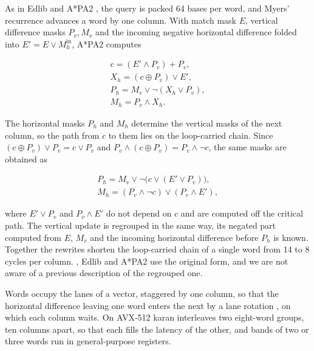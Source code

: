 As in Edlib and A*PA2 \citep{Sosic2017edlib,GrootKoerkamp2024astarpa2}, the query is packed 64 bases per word, and Myers' recurrence \citep{Myers1999bitvector} advances a word by one column. With match mask \(E\), vertical difference masks \(P_v, M_v\) and the incoming negative horizontal difference folded into \(E' = E \lor M_h^{\mathrm{in}}\), A*PA2 computes

\begin{equation}\begin{gathered}
c = (E' \land P_v) + P_v,\\ X_h = (c \oplus P_v) \lor E',\\ P_h = M_v \lor \lnot(X_h \lor P_v),\\ M_h = P_v \land X_h.
\end{gathered}\end{equation}

The horizontal masks \(P_h\) and \(M_h\) determine the vertical masks of the next column, so the path from \(c\) to them lies on the loop-carried chain. Since \((c \oplus P_v) \lor P_v = c \lor P_v\) and \(P_v \land (c \oplus P_v) = P_v \land \lnot c\), the same masks are obtained as

\begin{equation}\begin{gathered}
P_h = M_v \lor \lnot\bigl(c \lor (E' \lor P_v)\bigr),\\ M_h = (P_v \land \lnot c) \lor (P_v \land E'),
\end{gathered}\end{equation}

where \(E' \lor P_v\) and \(P_v \land E'\) do not depend on \(c\) and are computed off the critical path. The vertical update is regrouped in the same way, its negated part computed from \(E\), \(M_v\) and the incoming horizontal difference before \(P_h\) is known. Together the rewrites shorten the loop-carried chain of a single word from 14 to 8 cycles per column. \citet{Myers1999bitvector}, Edlib and A*PA2 use the original form, and we are not aware of a previous description of the regrouped one.

Words occupy the lanes of a vector, staggered by one column, so that the horizontal difference leaving one word enters the next by a lane rotation \citep{Wozniak1997,GrootKoerkamp2024astarpa2}, on which each column waits. On AVX-512 karan interleaves two eight-word groups, ten columns apart, so that each fills the latency of the other, and bands of two or three words run in general-purpose registers.

